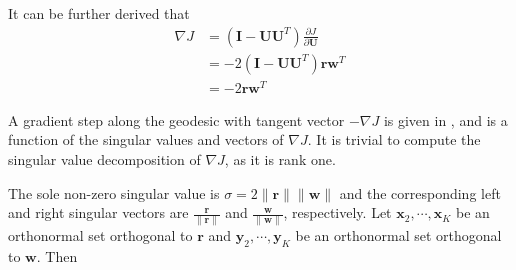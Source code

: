 It can be further derived that \cite[]{edelman1988}
\begin{equation}
\label{eq:grad}
\begin{split}
\nabla J &= (\mathbf{I}-\mathbf{UU}^T)\frac{\partial J}{\partial \mathbf{U}} \\
&=-2(\mathbf{I}-\mathbf{UU}^T)\mathbf{rw}^T\\
&=-2\mathbf{rw}^T
\end{split}
\end{equation}

A gradient step along the geodesic with tangent vector $-\nabla J$ is given %
in  \cite{edelman1988}, and is a function of the 
singular values and vectors of $\nabla J$. It is trivial to compute the singular value decomposition of $\nabla J$, as it is rank one. 

The sole non-zero singular value is $\sigma=2\parallel \mathbf{r} \parallel\parallel \mathbf{w} \parallel$ and the corresponding left and right singular vectors are $\frac{\mathbf{r}}{\parallel \mathbf{r} \parallel}$ and $\frac{\mathbf{w}}{\parallel \mathbf{w} \parallel}$, respectively. Let $\mathbf{x}_2,\cdots,\mathbf{x}_K$ be an orthonormal set orthogonal to $\mathbf{r}$ and $\mathbf{y}_2,\cdots,\mathbf{y}_K$ be an orthonormal set orthogonal to $\mathbf{w}$. Then


